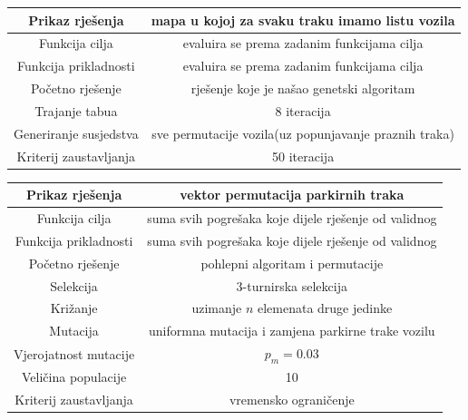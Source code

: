 \documentclass[11pt]{article}
\begin{document}
\begin{center}
\centering
{} \label{tab:title} 
  \begin{tabular}{ | >{\columncolor[gray]{0.6}}c | c |}
    \hline
     Prikaz rješenja & mapa u kojoj za svaku traku imamo listu vozila \\ \hline
     Funkcija cilja & evaluira se prema zadanim funkcijama cilja \\ \hline
     Funkcija prikladnosti &  evaluira se prema zadanim funkcijama cilja\\ \hline
     Početno rješenje &  rješenje koje je našao genetski algoritam\\ \hline
     Trajanje tabua &  8 iteracija\\ \hline
     Generiranje susjedstva &  sve permutacije vozila(uz popunjavanje praznih traka)\\ \hline
     Kriterij zaustavljanja & 50 iteracija \\ \hline
\end{tabular}
\end{center}


\begin{center}
\centering
{} \label{tab:title} 
  \begin{tabular}{ | >{\columncolor[gray]{0.6}}c |c|}
    \hline
     Prikaz rješenja & vektor permutacija parkirnih traka \\ \hline
     Funkcija cilja & suma svih pogrešaka koje dijele rješenje od validnog \\ \hline
     Funkcija prikladnosti &  suma svih pogrešaka koje dijele rješenje od validnog\\ \hline
     Početno rješenje &  pohlepni algoritam i permutacije \\ \hline
     Selekcija &  3-turnirska selekcija\\ \hline
     Križanje &  uzimanje $n$ elemenata druge jedinke\\ \hline
     Mutacija &  uniformna mutacija i zamjena parkirne trake vozilu\\ \hline
     Vjerojatnost mutacije &  $p_m=0.03$ \\ \hline
     Veličina populacije &  10\\ \hline
     Kriterij zaustavljanja & vremensko ograničenje \\ \hline
\end{tabular}
\end{center}
\newpage
\end{document}
